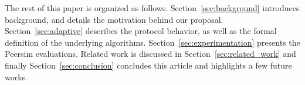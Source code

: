 
The rest of this paper is organized as
follows. Section~\ref{sec:background} introduces background, and
details the motivation behind our proposal.
Section~\ref{sec:adaptive} describes the protocol behavior, as well
as the formal definition of the underlying
algorithms. Section~\ref{sec:experimentation} presents the Peersim
evaluations.  Related work is discussed in
Section~\ref{sec:related_work} and finally
Section~\ref{sec:conclusion} concludes this article and highlights a
few future works.
  

